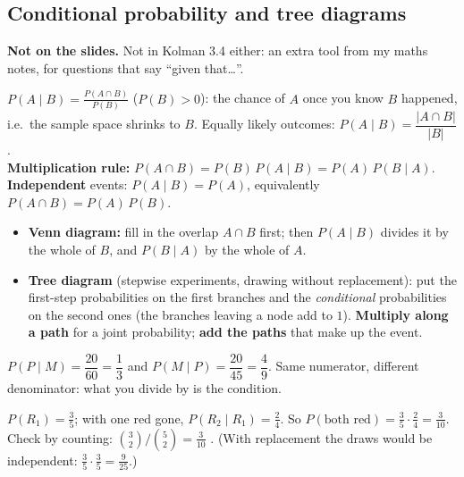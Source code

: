 \documentclass{fkt-notes}
\newcommand{\notslides}[1]{\par\noindent\textbf{Not on the slides.} #1\par}
\theoremstyle{definition}
\begin{document}
\subsection{Conditional probability and tree diagrams}\label{qg:cond}
%
\notslides{Not in Kolman 3.4 either: an extra tool from my maths notes, for
  questions that say ``given that\ldots''.}
\begin{rulebox}[title={Conditional probability}]
  $\displaystyle P(A\mid B)=\frac{P(A\cap B)}{P(B)}$ \quad ($P(B)>0$): the
  chance of $A$ once you know $B$ happened, i.e.\ the sample space shrinks
  to $B$. Equally likely outcomes: $P(A\mid B)=\dfrac{|A\cap B|}{|B|}$.\\[3pt]
  \textbf{Multiplication rule:} $P(A\cap B)=P(B)\,P(A\mid B)=P(A)\,P(B\mid A)$.\\[3pt]
  \textbf{Independent} events: $P(A\mid B)=P(A)$, equivalently
  $P(A\cap B)=P(A)\,P(B)$.
\end{rulebox}
\begin{itemize}[nosep]
  \item \textbf{Venn diagram:} fill in the overlap $A\cap B$ first; then
        $P(A\mid B)$ divides it by the whole of $B$, and $P(B\mid A)$ by the
        whole of $A$.
  \item \textbf{Tree diagram} (stepwise experiments, drawing without
        replacement): put the first-step probabilities on the first
        branches and the \emph{conditional} probabilities on the second
        ones (the branches leaving a node add to $1$). \textbf{Multiply
        along a path} for a joint probability; \textbf{add the paths} that
        make up the event.
\end{itemize}
\begin{example}
  $P(P\mid M)=\dfrac{20}{60}=\dfrac13$ and $P(M\mid P)=\dfrac{20}{45}=\dfrac49$.
  Same numerator, different denominator: what you divide by is the
  condition.
\end{example}
\begin{example}
  $P(R_1)=\frac35$; with one red gone, $P(R_2\mid R_1)=\frac24$. So
  $P(\text{both red})=\frac35\cdot\frac24=\frac3{10}$. Check by counting:
  $\binom32/\binom52=\frac3{10}$ \checkmark. (With replacement the draws
  would be independent: $\frac35\cdot\frac35=\frac9{25}$.)
\end{example}
\end{document}
